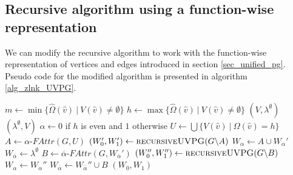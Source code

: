 \subsection{Recursive algorithm using a function-wise representation}
We can modify the recursive algorithm to work with the function-wise representation of vertices and edges introduced in section \ref{sec_unified_pg}. Pseudo code for the modified algorithm is presented in algorithm \ref{alg_zlnk_UVPG}.
\begin{algorithm}
	\caption{$\textsc{recursiveUVPG}(\textit{PG } G = (\\
		V : \hat{V} \rightarrow 2^\mathfrak{C},\\
		\hat{V}_0 \subseteq \hat{V},\\
		\hat{V}_1 \subseteq \hat{V},\\
		E : \hat{E} \rightarrow 2^\mathfrak{C},\\
		\hat{\Omega} : \hat{V}\rightarrow \mathbb{N}$}\label{alg_zlnk_UVPG}
	\begin{algorithmic}[1]
		\State $m \gets \min\{ \hat{\Omega}(\hat{v})\ |\ V(\hat{v}) \neq \emptyset \}$
		\State $h \gets \max\{ \hat{\Omega}(\hat{v})\ |\ V(\hat{v}) \neq \emptyset \}$
		\State \Return $(V,\lambda^\emptyset)$
		\Else
		\State \Return $(\lambda^\emptyset, V)$
		\EndIf
		\EndIf
		\State $\alpha \gets 0$ if $h$ is even and $1$ otherwise
		\State $U \gets \bigcup\{V(\hat{v})\ |\ \Omega(\hat{v}) = h \}$
		\State $A \gets \alpha\textit{-FAttr}(G, U)$
		\State $(W_0', W_1') \gets \textsc{recursiveUVPG}(G \backslash A)$
		\State $W_\alpha \gets A \cup W_\alpha'$
		\State $W_{\overline{\alpha}} \gets \lambda^\emptyset$
		\Else
		\State $B \gets \overline{\alpha}\textit{-FAttr}(G,W_{\overline{\alpha}}')$
		\State $(W_0'', W_1'') \gets \textsc{recursiveUVPG}(G \backslash B)$
		\State $W_\alpha \gets W_\alpha''$
		\State $W_{\overline{\alpha}} \gets W_{\overline{\alpha}}'' \cup B$
		\EndIf
		\State \Return $(W_0, W_1)$
	\end{algorithmic}
\end{algorithm}

